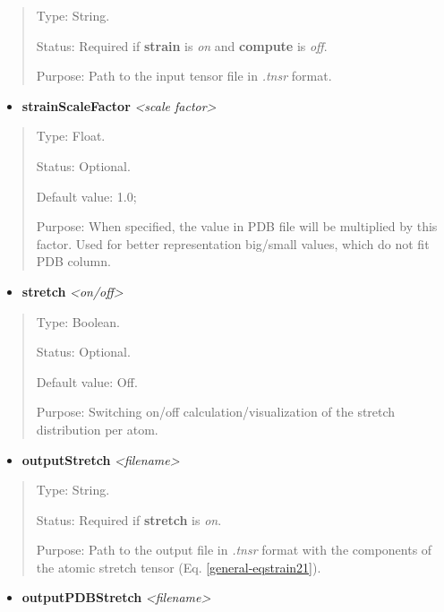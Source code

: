 \documentclass[letterpaper,10pt,english]{sphinxmanual}
\begin{document}
\begin{quote}

Type: String.

Status: Required if \textbf{strain} is \emph{on} and \textbf{compute} is \emph{off}.

Purpose:  Path to the input tensor file in \emph{.tnsr} format.
\end{quote}
\begin{itemize}
\item {} 
\textbf{strainScaleFactor} \emph{\textless{}scale factor\textgreater{}}

\end{itemize}
\begin{quote}

Type: Float.

Status: Optional.

Default value: 1.0;

Purpose: When specified, the value in PDB file will be multiplied by this factor. Used for better representation big/small values, which do not fit PDB column.
\end{quote}
\begin{itemize}
\item {} 
\textbf{stretch} \emph{\textless{}on/off\textgreater{}}

\end{itemize}
\begin{quote}

Type: Boolean.

Status: Optional.

Default value: Off.

Purpose: Switching on/off calculation/visualization of the stretch distribution per atom.
\end{quote}
\begin{itemize}
\item {} 
\textbf{outputStretch} \emph{\textless{}filename\textgreater{}}

\end{itemize}
\begin{quote}

Type: String.

Status: Required if \textbf{stretch} is \emph{on}.

Purpose:  Path to the output file in \emph{.tnsr} format with the components of the atomic stretch tensor (Eq. \eqref{general-eqstrain21}).
\end{quote}
\begin{itemize}
\item {} 
\textbf{outputPDBStretch} \emph{\textless{}filename\textgreater{}}

\end{itemize}
\end{document}
